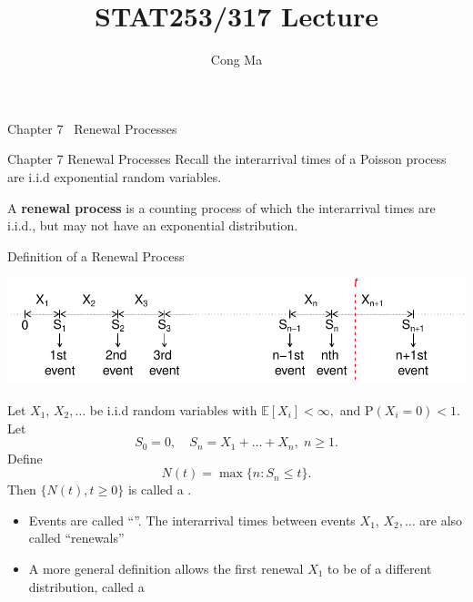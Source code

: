 \documentclass[letterpaper,handout, mathserif]{beamer}
\title{STAT253/317 Lecture \chapnum} \date{} \author{Cong Ma}
\def\p{\mathrm P}
\def\E{\mathbb E}
\begin{document}
\begin{frame}\maketitle\begin{center}Chapter 7 \ Renewal Processes\end{center}\end{frame}
\begin{frame}{Chapter 7 Renewal Processes}
Recall the interarrival times of a Poisson process are i.i.d exponential random variables.

\vfill 
A {\bf renewal process} is a counting process of which the interarrival times are i.i.d., but may not have an exponential distribution.\bigskip

\end{frame}
\begin{frame}{Definition of a Renewal Process}
\begin{center}
\includegraphics[width=\textwidth]{interarrivaltimes.pdf}
\end{center}
Let $X_1$, $X_2,\ldots$ be i.i.d random variables with $\E[X_i]<\infty,$ and $\p(X_i=0)  < 1$. Let
$$S_0=0, \quad S_n=X_1+\ldots+X_n, \;n\ge 1.$$
Define $$N(t)=\max\{n: S_n\le t\}.$$
Then $\{N(t), t\ge 0\}$ is called a .
\begin{itemize}
\item Events are called ``''. The interarrival times between events $X_1$, $X_2,\ldots$ are  also called ``renewals''
\item A more general definition allows the first renewal $X_1$ to be of a different distribution, called a 
\end{itemize}
\end{frame}
\end{document}
